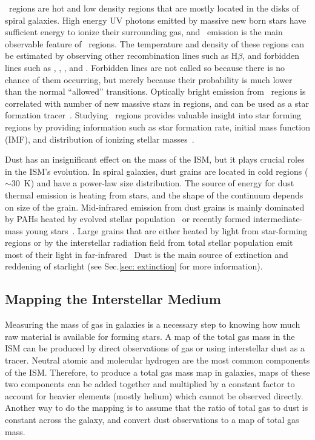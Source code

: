 \hii~regions are hot and low density regions that are mostly located in the disks of spiral galaxies.
High energy UV photons emitted by massive new born stars have sufficient energy to ionize their surrounding gas, and
~\halpha emission is the main observable feature of \hii~regions.
The temperature and density of these regions can be estimated by observing other recombination lines such as H$\beta$, and forbidden lines such as \sii, \oii, \oiii, and \nii. 
Forbidden lines are not called so because there is no chance of them occurring, but merely because their probability is much lower than the normal ``allowed'' transitions.
Optically bright \halpha emission from \hii~regions is correlated with number of new massive stars in regions, and can be used as a star formation tracer~\citep[e.g.][]{Kennicutt98b,Calzetti13}.
Studying \hii~regions provides valuable insight into star forming regions by providing information such as star formation rate, initial mass function (IMF), and distribution of ionizing stellar masses~\citep[][and references therein]{Azimlu11}.


Dust has an insignificant effect on the mass of the ISM, but it plays crucial roles in the ISM's evolution.
In spiral galaxies, dust grains are located in cold regions ($\sim$30~K) and have a power-law size distribution.
The source of energy for dust thermal emission is heating from stars, and the shape of the continuum depends on size of the grain.
Mid-infrared emission from dust grains is mainly dominated by PAHs heated by evolved stellar population~\cite{Smith07a} or recently formed intermediate-mass young stars~\cite{Peeters04}. 
Large grains that are either heated by light from star-forming regions or by the interstellar radiation field from total stellar population emit most of their light in far-infrared~\citep[e.g.][]{Calapa14, lu14}
Dust is the main source of extinction and reddening of starlight (see Sec.\ref{sec: extinction} for more information).

\subsection{Mapping the Interstellar Medium} 
\label{sec: ismmap}
Measuring the mass of gas in galaxies is a necessary step to knowing how much raw material is available for forming stars.
A map of the total gas mass in the ISM can be produced by direct observations of gas or using interstellar dust as a tracer. 
Neutral atomic and molecular hydrogen are the most common components of the ISM. 
Therefore, to produce a total gas mass map in galaxies, maps of these two components can be added together and multiplied by a constant factor to account for heavier elements (mostly helium) which cannot be observed directly. 
Another way to do the mapping is to assume that the ratio of total gas to dust is constant across the galaxy, and convert dust observations to a map of total gas mass.


